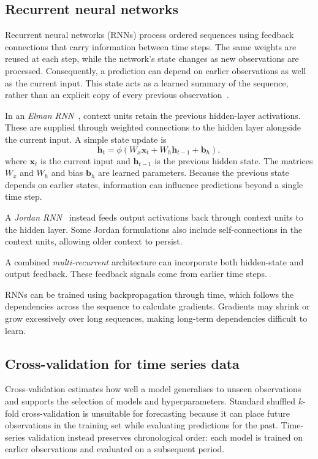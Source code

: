 \subsection{Recurrent neural networks}
Recurrent neural networks (RNNs) process ordered sequences using feedback
connections that carry information between time steps. The same weights are
reused at each step, while the network's state changes as new observations are
processed. Consequently, a prediction can depend on earlier observations as
well as the current input. This state acts as a learned summary of the sequence,
rather than an explicit copy of every previous observation~\cite{Kelleher2020}.

In an \emph{Elman RNN}~\cite{ELMAN1990179}, context units retain the previous
hidden-layer activations. These are supplied through weighted connections to the
hidden layer alongside the current input. A simple state update is
\begin{equation}
  \mathbf{h}_t = \phi\left(
    W_x\mathbf{x}_t + W_h\mathbf{h}_{t-1} + \mathbf{b}_h
  \right),
\end{equation}
where $\mathbf{x}_t$ is the current input and $\mathbf{h}_{t-1}$ is the previous
hidden state. The matrices $W_x$ and $W_h$ and bias $\mathbf{b}_h$ are learned
parameters. Because the previous state depends on earlier states, information
can influence predictions beyond a single time step.

A \emph{Jordan RNN}~\cite{Jordan1997SerialOA} instead feeds output activations
back through context units to the hidden layer. Some Jordan formulations also
include self-connections in the context units, allowing older context to
persist.

A combined \emph{multi-recurrent} architecture can incorporate both hidden-state
and output feedback. These feedback signals come from earlier time steps.

RNNs can be trained using backpropagation through time, which follows the
dependencies across the sequence to calculate gradients. Gradients may shrink or
grow excessively over long sequences, making long-term dependencies difficult to
learn.

\subsection{Cross-validation for time series data}
Cross-validation estimates how well a model generalises to unseen observations
and supports the selection of models and hyperparameters. Standard shuffled
$k$-fold cross-validation is unsuitable for forecasting because it can place
future observations in the training set while evaluating predictions for the
past. Time-series validation instead preserves chronological order: each model
is trained on earlier observations and evaluated on a subsequent period.

